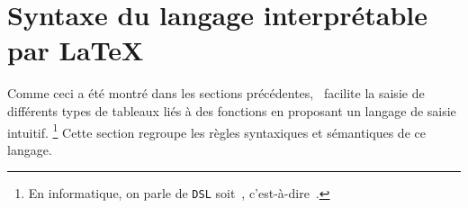 \documentclass[10pt, a4paper]{article}
\begin{document}
\section{Syntaxe du langage interprétable par \LaTeX}
\label{tns-math-functab-dsl-l3}

Comme ceci a été montré dans les sections précédentes, \thispack\ facilite la saisie de différents types de tableaux liés à des fonctions en proposant un langage de saisie intuitif.
\footnote{
    En informatique, on parle de \texttt{DSL} soit \,, c'est-à-dire \,.
}
Cette section regroupe les règles syntaxiques et sémantiques de ce langage.
\end{document}
